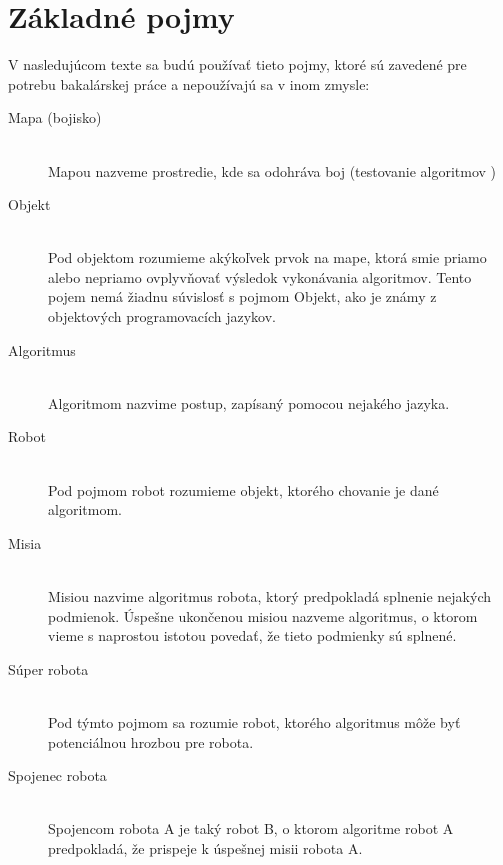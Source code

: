 \section{ Základné pojmy }
V nasledujúcom texte sa budú používať tieto pojmy, ktoré sú zavedené pre potrebu bakalárskej práce a nepoužívajú sa v inom zmysle:
\begin{description}
\item[Mapa (bojisko)]\hfill \\
	Mapou nazveme prostredie, kde sa odohráva boj (testovanie algoritmov )
\item[Objekt]\hfill \\
	Pod objektom rozumieme akýkoľvek prvok na mape, ktorá smie priamo alebo nepriamo ovplyvňovať výsledok vykonávania algoritmov. Tento pojem nemá žiadnu súvislosť s pojmom Objekt, ako je známy z objektových programovacích jazykov.
\item[Algoritmus]\hfill \\
	Algoritmom nazvime postup, zapísaný pomocou nejakého jazyka. 
\item[Robot]\hfill \\
	Pod pojmom robot rozumieme objekt, ktorého chovanie je dané algoritmom.
\item[Misia]\hfill \\
	Misiou nazvime algoritmus robota, ktorý predpokladá splnenie nejakých podmienok. Úspešne ukončenou misiou nazveme algoritmus, o ktorom vieme s naprostou istotou povedať, že tieto podmienky sú splnené.
\item[Súper robota]\hfill \\
	Pod týmto pojmom sa rozumie robot, ktorého algoritmus môže byť potenciálnou hrozbou pre robota.
\item[Spojenec robota] \hfill \\
	Spojencom robota A je taký robot B, o ktorom algoritme robot A predpokladá, že prispeje k úspešnej misii robota A. %
\end{description}


